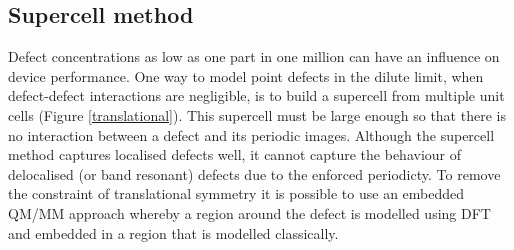 

\subsection{Supercell method}

Defect concentrations as low as one part in one million can have an influence on device performance. 
One way to model point defects in the dilute limit, when defect-defect interactions are negligible, is to build a supercell from multiple unit cells (Figure \ref{translational}).
This supercell must be large enough so that there is no interaction between a defect and its periodic images.
Although the supercell method captures localised defects well, it cannot capture the behaviour of delocalised (or band resonant) defects due to the enforced periodicty. 
To remove the constraint of translational symmetry it is possible to use an embedded QM/MM approach whereby a region around the defect is modelled using DFT and embedded in a region that is modelled classically.


